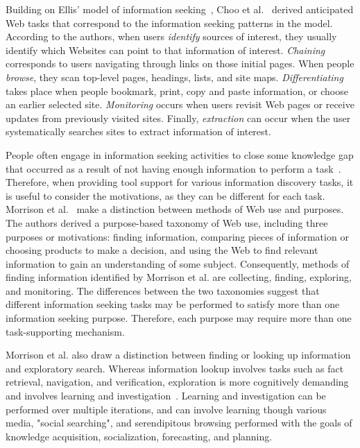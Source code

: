 \documentclass{sigchi}
\begin{document}
Building on Ellis' model of information seeking~\cite{ellis1989behavioural,ellis1993comparison,ellis1997modelling}, Choo et al.~\cite{choo2000information} derived anticipated Web tasks that correspond to the information seeking patterns in the model. According to the authors, when users \textit{identify} sources of interest, they usually identify which Websites can point to that information of interest.  \textit{Chaining} corresponds to users navigating through links on those initial pages. When people \textit{browse}, they scan top-level pages, headings, lists, and site maps. \textit{Differentiating} takes place when people bookmark, print, copy and paste information, or choose an earlier selected site. \textit{Monitoring} occurs when users revisit Web pages or receive updates from previously visited sites. Finally, \textit{extraction} can occur when the user systematically searches sites to extract information of interest.  

People often engage in information seeking activities to close some knowledge gap that occurred as a result of not having enough information to perform a task~\cite{proper1999information}. Therefore, when providing tool support for various information discovery tasks, it is useful to consider the motivations, as they can be different for each task. Morrison et al.~\cite{morrison2001taxonomic} make a distinction between methods of Web use and purposes. The authors derived a purpose-based taxonomy of Web use, including three purposes or motivations: finding information, comparing pieces of information or choosing products to make a decision, and using the Web to find relevant information to gain an understanding of some subject. Consequently, methods of finding information identified by Morrison et al. are collecting, finding, exploring, and monitoring. The differences between the two taxonomies suggest that different information seeking tasks may be performed to satisfy more than one information seeking purpose. Therefore, each purpose may require more than one task-supporting mechanism. 

Morrison et al. also draw a distinction between finding or looking up information and exploratory search. Whereas information lookup involves tasks such as fact retrieval, navigation, and verification, exploration is more cognitively demanding and involves learning and investigation~\cite{marchionini2006exploratory}. Learning and investigation can be performed over multiple iterations, and can involve learning though various media, "social searching", and serendipitous browsing performed with the goals of knowledge acquisition, socialization, forecasting, and planning.  
\end{document}
